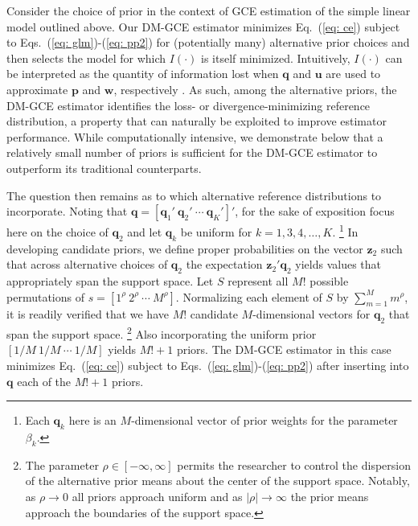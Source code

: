 \documentclass{elsarticle}
\begin{document}
Consider the choice of prior in the context of GCE estimation of the simple 
linear model outlined above.
Our DM-GCE estimator minimizes Eq.\ (\ref{eq: ce}) subject to 
Eqs.\ (\ref{eq: glm})-(\ref{eq: pp2}) for (potentially many) alternative prior 
choices and then selects the model for which $I(\cdot)$ is itself minimized.
Intuitively, $I(\cdot)$ can be interpreted as the quantity of information lost
when $\mathbf{q}$ and $\mathbf{u}$ are used to approximate $\mathbf{p}$
and $\mathbf{w}$, respectively \citep{burnham2002}.
As such, among the alternative priors, the DM-GCE estimator identifies the 
loss- or divergence-minimizing reference distribution, a property that
can naturally be exploited to improve estimator performance.
While computationally intensive, we demonstrate below that a relatively small 
number of priors is sufficient for the DM-GCE estimator to outperform its 
traditional counterparts.

The question then remains as to which alternative reference distributions to 
incorporate.
Noting that $\mathbf{q}=[\mathbf{q}_1' ~ \mathbf{q}_2' ~ 
\cdots ~ \mathbf{q}_K' ]'$, for the sake of exposition focus here on the 
choice of $\mathbf{q}_2$ and let $\mathbf{q}_k$ be uniform for 
$k=1,3,4,\ldots, K$.%
\footnote{Each $\mathbf{q}_k$ here is an $M$-dimensional vector of 
 prior weights for the parameter $\beta_k$.}
In developing candidate priors, we define proper probabilities on the vector 
$\mathbf{z}_2$ such that across alternative choices of $\mathbf{q}_2$ the 
expectation $\mathbf{z}_2'\mathbf{q}_2$  yields values that appropriately
span the support space. 
Let $S$ represent all  $M!$ possible permutations of 
$s = [1^\rho ~ 2^\rho ~ \cdots ~ M^\rho]$.
Normalizing each element of $S$ by $\sum_{m=1}^M m^\rho$, it is 
readily verified that we have $M!$ candidate $M$-dimensional vectors for 
$\mathbf{q}_2$ that span the support space.%
\footnote{The parameter $\rho \in [-\infty, \infty]$ permits the researcher
to control the dispersion of the alternative prior means about the center of the 
support space.
Notably, as $\rho \to 0$ all priors approach uniform and as $|\rho| \to 
\infty$ the prior means approach the boundaries of the support space.}
Also incorporating the uniform prior $[1/M ~ 1/M ~ \cdots ~ 1/M]$ yields 
$M! + 1$ priors.
The DM-GCE estimator in this case minimizes Eq.\ (\ref{eq: ce}) subject 
to Eqs.\ (\ref{eq: glm})-(\ref{eq: pp2}) after inserting into $\mathbf{q}$ 
each of the $M! + 1$ priors.

\end{document}
